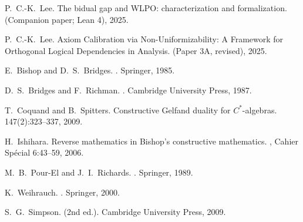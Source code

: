 \documentclass[11pt]{article}
\theoremstyle{plain}
\theoremstyle{definition}
\theoremstyle{remark}
\begin{document}

\begin{thebibliography}{99}

P.~C.-K.~Lee.
\newblock The bidual gap and WLPO: characterization and formalization.
\newblock (Companion paper; Lean 4), 2025.

P.~C.-K.~Lee.
\newblock Axiom Calibration via Non-Uniformizability: A Framework for Orthogonal Logical Dependencies in Analysis.
\newblock (Paper 3A, revised), 2025.

E.~Bishop and D.~S.~Bridges.
.
\newblock Springer, 1985.

D.~S.~Bridges and F.~Richman.
.
\newblock Cambridge University Press, 1987.

T.~Coquand and B.~Spitters.
\newblock Constructive Gelfand duality for $C^*$-algebras.
 147(2):323--337, 2009.

H.~Ishihara.
\newblock Reverse mathematics in {B}ishop's constructive mathematics.
, Cahier Sp\'ecial 6:43--59, 2006.

M.~B.~Pour-El and J.~I.~Richards.
.
\newblock Springer, 1989.

K.~Weihrauch.
.
\newblock Springer, 2000.

S.~G.~Simpson.
 (2nd ed.).
\newblock Cambridge University Press, 2009.

\end{thebibliography}
\end{document}

